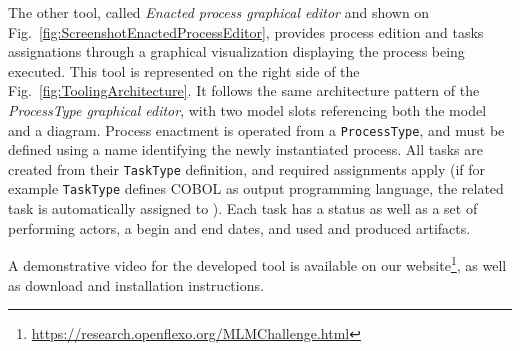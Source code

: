 The other tool, called \textit{Enacted process graphical editor} and shown on
Fig.~\ref{fig:ScreenshotEnactedProcessEditor}, provides process edition and
tasks assignations through a graphical visualization displaying the process
being executed. This tool is represented on the right side of the
Fig.~\ref{fig:ToolingArchitecture}. It follows the same architecture pattern of
the \textit{ProcessType graphical editor}, with two model slots referencing
both the model and a diagram. Process enactment is operated from a
\texttt{ProcessType}, and must be defined using a name identifying the newly
instantiated process. All tasks are created from their \texttt{TaskType}
definition, and required assignments apply (if for example 
\texttt{TaskType} defines COBOL as output programming language, the related
task is automatically assigned to ). Each task has a status as
well as a set of performing actors, a begin and end dates, and used and
produced artifacts.

A demonstrative video for the developed tool is available on our
website\footnote{\url{https://research.openflexo.org/MLMChallenge.html}}, as
well as download and installation instructions.
